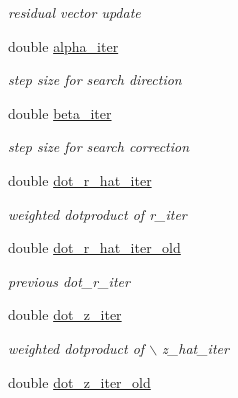 \begin{CompactItemize}
\begin{CompactList}\small\item\em residual vector update \item\end{CompactList}\item 
\hypertarget{structimri__inh__3d__adjoint__plan_o10}{
double \hyperlink{structimri__inh__3d__adjoint__plan_o10}{alpha\_\-iter}}
\label{structimri__inh__3d__adjoint__plan_o10}

\begin{CompactList}\small\item\em step size for search direction \item\end{CompactList}\item 
\hypertarget{structimri__inh__3d__adjoint__plan_o11}{
double \hyperlink{structimri__inh__3d__adjoint__plan_o11}{beta\_\-iter}}
\label{structimri__inh__3d__adjoint__plan_o11}

\begin{CompactList}\small\item\em step size for search correction \item\end{CompactList}\item 
\hypertarget{structimri__inh__3d__adjoint__plan_o12}{
double \hyperlink{structimri__inh__3d__adjoint__plan_o12}{dot\_\-r\_\-hat\_\-iter}}
\label{structimri__inh__3d__adjoint__plan_o12}

\begin{CompactList}\small\item\em weighted dotproduct of r\_\-iter \item\end{CompactList}\item 
\hypertarget{structimri__inh__3d__adjoint__plan_o13}{
double \hyperlink{structimri__inh__3d__adjoint__plan_o13}{dot\_\-r\_\-hat\_\-iter\_\-old}}
\label{structimri__inh__3d__adjoint__plan_o13}

\begin{CompactList}\small\item\em previous dot\_\-r\_\-iter \item\end{CompactList}\item 
\hypertarget{structimri__inh__3d__adjoint__plan_o14}{
double \hyperlink{structimri__inh__3d__adjoint__plan_o14}{dot\_\-z\_\-iter}}
\label{structimri__inh__3d__adjoint__plan_o14}

\begin{CompactList}\small\item\em weighted dotproduct of $\backslash$ z\_\-hat\_\-iter \item\end{CompactList}\item 
\hypertarget{structimri__inh__3d__adjoint__plan_o15}{
double \hyperlink{structimri__inh__3d__adjoint__plan_o15}{dot\_\-z\_\-iter\_\-old}}
\label{structimri__inh__3d__adjoint__plan_o15}


\end{CompactItemize}
